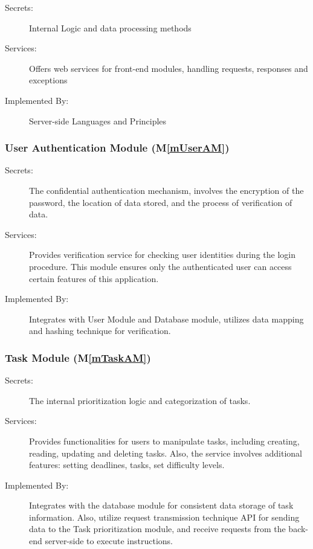 \documentclass[12pt, titlepage]{article}
\newcommand{\mref}[1]{M\ref{#1}}
\begin{document}
\begin{description}
\item[Secrets:] Internal Logic and data processing methods
\item[Services:] Offers web services for front-end modules, handling requests, responses and exceptions
\item[Implemented By:] Server-side Languages and Principles
\end{description}


\subsubsection{User Authentication Module (\mref{mUserAM})}

\begin{description}
\item[Secrets:] The confidential authentication mechanism, involves the encryption of the password, the location of data stored, and the process of verification of data.
\item[Services:]  Provides verification service for checking user identities during the login procedure. This module ensures only the authenticated user can access certain features of this application.
\item[Implemented By:] Integrates with User Module and Database module, utilizes data mapping and hashing technique for verification. 
\end{description}

\subsubsection{Task Module (\mref{mTaskAM})}

\begin{description}
\item[Secrets:] The internal prioritization logic and categorization of tasks.
\item[Services:] Provides functionalities for users to manipulate tasks, including creating, reading, updating and deleting tasks. Also, the service involves additional features: setting deadlines,  tasks, set difficulty levels. 
\item[Implemented By:] Integrates with the database module for consistent data storage of task information. Also, utilize request transmission technique API for sending data to the Task prioritization module, and receive requests from the back-end server-side to execute instructions.
\end{description}
\end{document}
